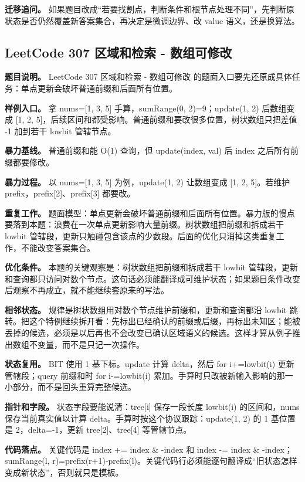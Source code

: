 \textbf{迁移追问。} 如果题目改成“若要找割点，判断条件和根节点处理不同”，先判断原状态是否仍然覆盖新答案集合，再决定是微调边界、改 value 语义，还是换算法。

\subsection{LeetCode 307 区域和检索 - 数组可修改}

\textbf{题目说明。} LeetCode 307 区域和检索 - 数组可修改 的题面入口要先还原成具体任务：单点更新会破坏普通前缀和后面所有位置。

\textbf{样例入口。} 拿 nums=[1, 3, 5] 手算，sumRange(0, 2)=9；update(1, 2) 后数组变成 [1, 2, 5]，后续区间和都受影响。普通前缀和要改很多位置，树状数组只把差值 -1 加到若干 lowbit 管辖节点。

\textbf{暴力基线。} 普通前缀和能 O(1) 查询，但 update(index, val) 后 index 之后所有前缀都要修改。

\textbf{暴力过程。} 以 nums=[1, 3, 5] 为例，update(1, 2) 让数组变成 [1, 2, 5]。若维护 prefix，prefix[2]、prefix[3] 都要改。

\textbf{重复工作。} 题面模型：单点更新会破坏普通前缀和后面所有位置。暴力版的慢点要落到本题：浪费在一次单点更新影响大量前缀。树状数组把前缀和拆成若干 lowbit 管辖段，更新只触碰包含该点的少数段。后面的优化只消掉这类重复工作，不能改变答案集合。

\textbf{优化条件。} 本题的关键观察是：树状数组把前缀和拆成若干 lowbit 管辖段，更新和查询都只访问对数个节点。这句话必须能翻译成可维护状态；如果题目条件改变后观察不再成立，就不能继续套原来的写法。

\textbf{相邻状态。} 规律是树状数组用对数个节点维护前缀和，更新和查询都沿 lowbit 跳转。把这个特例继续拆开看：先标出已经确认的前缀或后缀，再标出未知区；能被丢掉的候选，必须是以后再也不会改变已确认区域语义的候选。这样才算从例子推出数组不变量，而不是只记一次操作。

\textbf{状态复用。} BIT 使用 1 基下标。update 计算 delta，然后 for i+=lowbit(i) 更新管辖段；query 前缀和时 for i-=lowbit(i) 累加。手算时只改被新输入影响的那一小部分，而不是回头重算完整候选。

\textbf{指针和字段。} 状态字段要能说清：tree[i] 保存一段长度 lowbit(i) 的区间和，nums 保存当前真实值以计算 delta。手算时按这个协议跟踪：update(1, 2) 的 1 基位置是 2，delta=-1，更新 tree[2]、tree[4] 等管辖节点。

\textbf{代码落点。} 关键代码是 index += index \& -index 和 index -= index \& -index；sumRange(l, r)=prefix(r+1)-prefix(l)。关键代码行必须能逐句翻译成“旧状态怎样变成新状态”，否则就只是模板。

